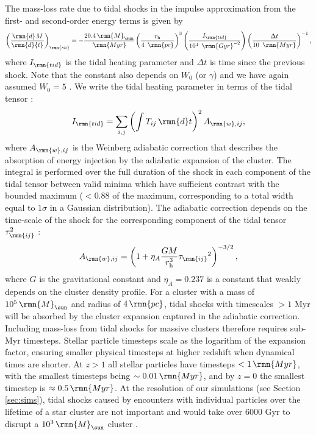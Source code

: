 \documentclass[fleqn,usenatbib]{mnras}
\newcommand\Msun{\,\rmn{M}_{\sun}}
\newcommand\Gyr{\,\rmn{Gyr}}
\newcommand\Myr{\,\rmn{Myr}}
\newcommand\pc{\,\rmn{pc}}
\newcommand{\derBr}[3][]{\left( \frac{\rmn{d}^{#1} #2}{\rmn{d} {#3}^{#1}} \right)}
\begin{document}
The mass-loss rate due to tidal shocks in the impulse approximation from the first- and second-order energy terms is given by
\begin{equation} \label{eq:dmsh}
\derBr{M}{t}_\rmn{sh} = - \frac{20.4 \Msun}{\Myr} \left(\frac{r_{\rm h}}{4~\pc}\right)^3 \left(\frac{I_\rmn{tid}}{10^4~\Gyr^{-2}}\right) \left(\frac{\Delta t}{10~\Myr}\right)^{-1} ,
\end{equation}
where $I_\rmn{tid}$ is the tidal heating parameter and $\Delta t$ is time since the previous shock. Note that the constant also depends on $W_0$ (or $\gamma$) and we have again assumed $W_0=5$ \citep[see][]{Kruijssen_et_al_11}.
We write the tidal heating parameter in terms of the tidal tensor \citep{Gnedin_Hernquist_and_Ostriker_99, Prieto_and_Gnedin_08}:
\begin{equation} \label{eq:Itid}
I_\rmn{tid} = \sum_{i,j} \left( \int T_{ij} \, \rmn{d}t \right)^2 A_{\rmn{w},ij} ,
\end{equation}
where $A_{\rmn{w},ij}$ is the Weinberg adiabatic correction \citep{Weinberg_94a,Weinberg_94b,Weinberg_94c} that describes the absorption of energy injection by the adiabatic expansion of the cluster. The integral is performed over the full duration of the shock in each component of the tidal tensor between valid minima which have sufficient contrast with the bounded maximum ($<0.88$ of the maximum, corresponding to a total width equal to $1 \sigma$ in a Gaussian distribution).
The adiabatic correction depends on the time-scale of the shock for the corresponding component of the tidal tensor $\tau_\rmn{ij}^2$ \citep{Gnedin_and_Ostriker_97,Gnedin_Hernquist_and_Ostriker_99}:
\begin{equation} \label{eq:AW}
A_{\rmn{w},ij} = \left(1 + \eta_A \frac{G M}{r_{\rm h}^3} {\tau_\rmn{ij}}^2 \right)^{-3/2} ,
\end{equation}
where $G$ is the gravitational constant and $\eta_A=0.237$ is a constant that weakly depends on the cluster density profile.
For a cluster with a mass of $10^5 \Msun$ and radius of $4 \pc$, tidal shocks with timescales $> 1$ Myr will be absorbed by the cluster expansion captured in the adiabatic correction. Including mass-loss from tidal shocks for massive clusters therefore requires sub-Myr timesteps. Stellar particle timesteps scale as the logarithm of the expansion factor, ensuring smaller physical timesteps at higher redshift when dynamical times are shorter. At $z>1$ all stellar particles have timesteps $<1 \Myr$, with the smallest timesteps being $\sim 0.01 \Myr$, and by $z=0$ the smallest timestep is $\approx 0.5 \Myr$. At the resolution of our simulations (see Section \ref{sec:sims}), tidal shocks caused by encounters with individual particles over the lifetime of a star cluster are not important and would take over 6000 Gyr to disrupt a $10^3 \Msun$ cluster \citep[following the calculation in Section 2.2.4 of][]{Kruijssen_et_al_11}.
\end{document}
